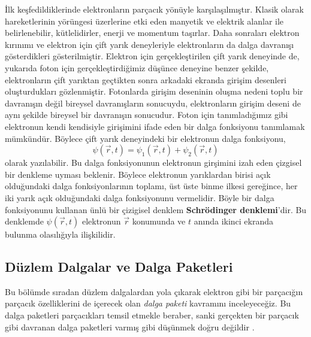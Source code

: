 \documentclass[a4paper,12pt, twoside]{article}
\begin{document}
İlk keşfedildiklerinde elektronların parçacık yönüyle karşılaşılmıştır. Klasik olarak hareketlerinin yörüngesi üzerlerine etki eden manyetik ve elektrik alanlar ile belirlenebilir, kütlelidirler, enerji ve momentum taşırlar. Daha sonraları elektron kırınımı ve elektron için çift yarık deneyleriyle elektronların da dalga davranışı gösterdikleri gösterilmiştir. Elektron için gerçekleştirilen çift yarık deneyinde de, yukarıda foton için gerçekleştirdiğimiz düşünce deneyine benzer şekilde, elektronların çift yarıktan geçtikten sonra arkadaki ekranda girişim desenleri oluşturdukları gözlenmiştir. Fotonlarda girişim deseninin oluşma nedeni toplu bir davranışın değil bireysel davranışların sonucuydu, elektronların girişim deseni de aynı şekilde bireysel bir davranışın sonucudur. Foton için tanımladığımız gibi elektronun kendi kendisiyle girişimini ifade eden bir dalga fonksiyonu tanımlamak mümkündür. Böylece çift yarık deneyindeki bir elektronun dalga fonksiyonu,
\begin{equation}
\psi(\vec r, t) = \psi_1(\vec r, t) + \psi_2(\vec r, t)
\label{eq:single_electron_wave}
\end{equation}
olarak yazılabilir. Bu dalga fonksiyonunun elektronun girşimini izah eden çizgisel bir denkleme uyması beklenir. Böylece elektronun yarıklardan birisi açık olduğundaki dalga fonksiyonlarının toplamı, üst üste binme ilkesi gereğince, her iki yarık açık olduğundaki dalga fonksiyonunu vermelidir. Böyle bir dalga fonksiyonunu kullanan ünlü bir çizigisel denklem {\bf Schrödinger denklemi}'dir. Bu denklemde $\psi (\vec r, t)$ elektronun $\vec r$ konumunda ve $t$ anında ikinci ekranda bulunma olasılığıyla ilişkilidir. 

\subsection{Düzlem Dalgalar ve Dalga Paketleri}

Bu bölümde sıradan düzlem dalgalardan yola çıkarak elektron gibi bir parçacığın parçacık özelliklerini de içerecek olan \emph{dalga paketi} kavramını inceleyeceğiz. Bu dalga paketleri parçacıkları temsil etmekle beraber, sanki gerçekten bir parçacık gibi davranan dalga paketleri varmış gibi düşünmek doğru değildir \cite{book:Gasiorowicz}.
\end{document}

